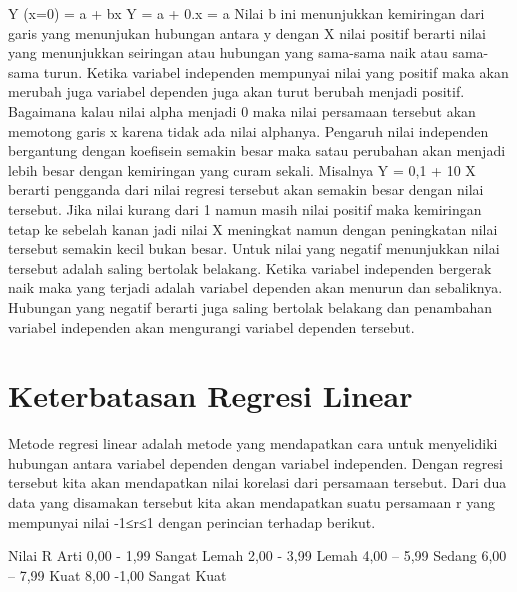 \documentclass[
]{book}
\theoremstyle{definition}
\theoremstyle{definition}
\theoremstyle{definition}
\theoremstyle{definition}
\theoremstyle{remark}
\begin{document}
Y (x=0) = a + bx
Y = a + 0.x = a
Nilai b ini menunjukkan kemiringan dari garis yang menunjukan hubungan antara y dengan X nilai positif berarti nilai yang menunjukkan seiringan atau hubungan yang sama-sama naik atau sama-sama turun. Ketika variabel independen mempunyai nilai yang positif maka akan merubah juga variabel dependen juga akan turut berubah menjadi positif. Bagaimana kalau nilai alpha menjadi 0 maka nilai persamaan tersebut akan memotong garis x karena tidak ada nilai alphanya.
Pengaruh nilai independen bergantung dengan koefisein semakin besar maka satau perubahan akan menjadi lebih besar dengan kemiringan yang curam sekali. Misalnya Y = 0,1 + 10 X berarti pengganda dari nilai regresi tersebut akan semakin besar dengan nilai tersebut. Jika nilai kurang dari 1 namun masih nilai positif maka kemiringan tetap ke sebelah kanan jadi nilai X meningkat namun dengan peningkatan nilai tersebut semakin kecil bukan besar. Untuk nilai yang negatif menunjukkan nilai tersebut adalah saling bertolak belakang. Ketika variabel independen bergerak naik maka yang terjadi adalah variabel dependen akan menurun dan sebaliknya. Hubungan yang negatif berarti juga saling bertolak belakang dan penambahan variabel independen akan mengurangi variabel dependen tersebut.

\hypertarget{keterbatasan-regresi-linear}{%
\section{Keterbatasan Regresi Linear}\label{keterbatasan-regresi-linear}}

Metode regresi linear adalah metode yang mendapatkan cara untuk menyelidiki hubungan antara variabel dependen dengan variabel independen. Dengan regresi tersebut kita akan mendapatkan nilai korelasi dari persamaan tersebut. Dari dua data yang disamakan tersebut kita akan mendapatkan suatu persamaan r yang mempunyai nilai -1≤r≤1 dengan perincian terhadap berikut.

Nilai R Arti
0,00 - 1,99 Sangat Lemah
2,00 - 3,99 Lemah
4,00 -- 5,99 Sedang
6,00 -- 7,99 Kuat
8,00 -1,00 Sangat Kuat
\end{document}
